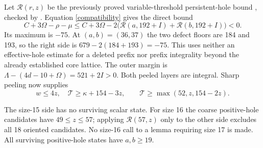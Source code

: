 \documentclass[11pt,a4paper]{article}
\newcommand{\T}{\mathcal T}
\begin{document}
Let $\mathcal R(r,z)$ be the previously proved variable-threshold
persistent-hole bound \cite{previous}, checked by
. Equation
\eqref{compatibility} gives the direct bound
\begin{equation}\label{directgate}
 C+3\Omega-\rho-\mu
 \le C+3\Omega-2\bigl(\mathcal R(a,192+I)+
                            \mathcal R(b,192+I)\bigr)<0.
\end{equation}
Its maximum is $-75$. At $(a,b)=(36,37)$ the two defect floors are
184 and 193, so the right side is $679-2(184+193)=-75$.
This uses neither an effective-hole estimate for a deleted prefix nor
prefix integrality beyond the already established core lattice.
The outer margin is $\Lambda-(4d-10+\Omega)=521+2I>0$.
Both peeled layers are integral. Sharp peeling now supplies
\begin{equation}\label{peeling}
 w\le4z,\quad \T\ge\kappa+154-3z,
 \qquad\T\ge\max(52,z,154-2z).
\end{equation}

The size-15 side has no surviving scalar state. For size 16 the coarse
positive-hole candidates have $49\le z\le57$; applying
$\mathcal R(57,z)$ only to the other side excludes all 18 oriented
candidates. No size-16 call to a lemma requiring size 17 is made.
All surviving positive-hole states have $a,b\ge19$.
\end{document}
